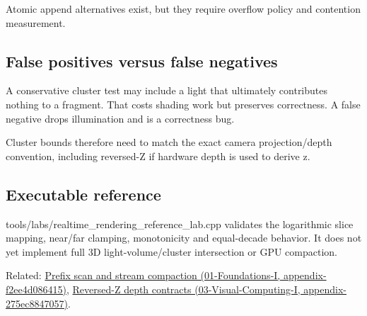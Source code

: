 Atomic append alternatives exist, but they require overflow policy and contention measurement.

\subsection{False positives versus false negatives}\label{appendix-b0efeb3f3648-false-positives-versus-false-negatives}

A conservative cluster test may include a light that ultimately contributes nothing to a fragment. That costs shading work but preserves correctness. A false negative drops illumination and is a correctness bug.

Cluster bounds therefore need to match the exact camera projection/depth convention, including reversed-Z if hardware depth is used to derive z.

\subsection{Executable reference}\label{appendix-b0efeb3f3648-executable-reference}

tools/labs/realtime\_rendering\_reference\_lab.cpp validates the logarithmic slice mapping, near/far clamping, monotonicity and equal-decade behavior. It does not yet implement full 3D light-volume/cluster intersection or GPU compaction.

Related: \href{../01-Foundations-I/main.pdf\#nameddest=appendix-f2ee4d086415}{Prefix scan and stream compaction (01-Foundations-I, appendix-f2ee4d086415)}, \href{../03-Visual-Computing-I/main.pdf\#nameddest=appendix-275ec8847057}{Reversed-Z depth contracts (03-Visual-Computing-I, appendix-275ec8847057)}.
